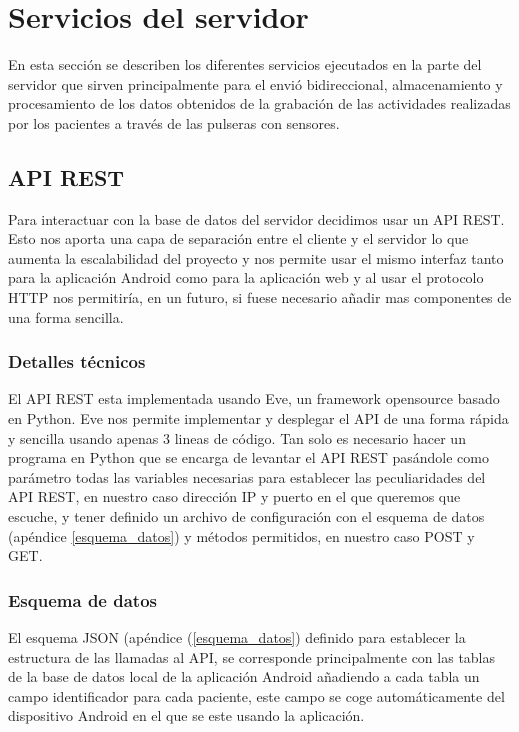 \documentclass[11pt,spanish]{article}
\begin{document}
\section{Servicios del servidor}
En esta sección se describen los diferentes servicios ejecutados en la parte del servidor que sirven principalmente para el envió bidireccional, almacenamiento y procesamiento de los datos obtenidos de la grabación de las actividades realizadas por los pacientes a través de las pulseras con sensores.

\subsection{API REST}
Para interactuar con la base de datos del servidor decidimos usar un API REST. Esto nos aporta una capa de separación entre el cliente y el servidor lo que aumenta la escalabilidad del proyecto y nos permite usar el mismo interfaz tanto para la aplicación Android como para la aplicación web y al usar el protocolo HTTP nos permitiría, en un futuro, si fuese necesario añadir mas componentes de una forma sencilla.

\subsubsection{Detalles técnicos}
El API REST esta implementada usando Eve, un framework opensource basado en Python. Eve nos permite implementar y desplegar el API de una forma rápida y sencilla usando apenas 3 lineas de código. Tan solo es necesario hacer un programa en Python que se encarga de levantar el API REST pasándole como parámetro todas las variables necesarias para establecer las peculiaridades del API REST, en nuestro caso dirección IP y puerto en el que queremos que escuche, y tener definido un archivo de configuración con el esquema de datos (apéndice \ref{esquema_datos}) y métodos permitidos, en nuestro caso POST y GET.

\subsubsection{Esquema de datos}

El esquema JSON (apéndice (\ref{esquema_datos}) definido para establecer la estructura de las llamadas al API, se corresponde principalmente con las tablas de la base de datos local de la aplicación Android añadiendo a cada tabla un campo identificador para cada paciente, este campo se coge automáticamente del dispositivo Android en el que se este usando la aplicación.
\newline
\end{document}

